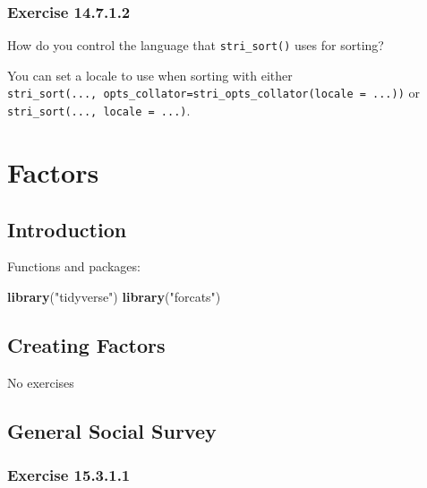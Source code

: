 \documentclass[]{book}
\newenvironment{Shaded}{\begin{snugshade}}{\end{snugshade}}
\newcommand{\KeywordTok}[1]{\textcolor[rgb]{0.13,0.29,0.53}{\textbf{#1}}}
\newcommand{\NormalTok}[1]{#1}
\newcommand{\StringTok}[1]{\textcolor[rgb]{0.31,0.60,0.02}{#1}}
\theoremstyle{plain}
\theoremstyle{remark}
\begin{document}
\hypertarget{exercise-14.7.1.2}{%
\subsection*{\texorpdfstring{Exercise
{14.7.1.2}}{Exercise 14.7.1.2}}\label{exercise-14.7.1.2}}

How do you control the language that \texttt{stri\_sort()} uses for
sorting?

You can set a locale to use when sorting with either
\texttt{stri\_sort(...,\ opts\_collator=stri\_opts\_collator(locale\ =\ ...))}
or \texttt{stri\_sort(...,\ locale\ =\ ...)}.

\hypertarget{factors}{%
\chapter{Factors}\label{factors}}

\hypertarget{introduction-10}{%
\section{Introduction}\label{introduction-10}}

Functions and packages:

\begin{Shaded}
\begin{Highlighting}[]
\KeywordTok{library}\NormalTok{(}\StringTok{"tidyverse"}\NormalTok{)}
\KeywordTok{library}\NormalTok{(}\StringTok{"forcats"}\NormalTok{)}
\end{Highlighting}
\end{Shaded}

\hypertarget{creating-factors}{%
\section{Creating Factors}\label{creating-factors}}

No exercises

\hypertarget{general-social-survey}{%
\section{General Social Survey}\label{general-social-survey}}

\hypertarget{exercise-15.3.1.1}{%
\subsection*{\texorpdfstring{Exercise
{15.3.1.1}}{Exercise 15.3.1.1}}\label{exercise-15.3.1.1}}
\end{document}
